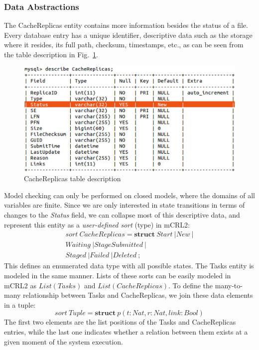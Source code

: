 \documentclass[sort&compress,preprint,3p]{elsarticle}
\begin{document}
\subsubsection{Data Abstractions}
The CacheReplicas entity contains more information besides the status of a file.
Every database entry has a unique identifier, descriptive data such as 
the storage where it resides, its full path, checksum, timestamps, etc., as can be seen
from the table description in Fig.~\ref{fig:CacheReplicasTable}.
\begin{figure}[bp!]
\begin{center}
 \includegraphics[width=0.5\linewidth,keepaspectratio=true]{./graphics/Figure5.png}
\end{center}
\caption{CacheReplicas table description}
\label{fig:CacheReplicasTable}
\end{figure}
Model checking can only be performed on closed models, where the domains
of all variables are finite. Since we are only interested in state transitions in terms of 
changes to the \textit{Status} field,
we can collapse most of this descriptive data, and represent this entity as a 
\textit{user-defined sort} (type) in mCRL2:
\begin{displaymath}
\begin{aligned}
sort\ CacheReplicas = \textbf{struct}\ Start\ | 
			  New\ |  \\
		    Waiting\ | 
          StageSubmitted\ | \\
		      Staged\ | 
		      Failed\ | 
		  Deleted\ ;
\end{aligned}
\end{displaymath}
This defines an enumerated data type with all possible states.
The Tasks entity is modeled in the same manner. Lists of these sorts can be easily modeled 
in mCRL2 as \begin{math}List(Tasks) \end{math} and 
\begin{math}List(CacheReplicas) \end{math}.
To define the many-to-many relationship between Tasks and CacheReplicas,
we join these data elements in a tuple:
\begin{displaymath}sort \ Tuple = \textbf{struct}\ p(t:Nat,r:Nat,link:Bool)
\end{displaymath}
The first two elements are the list positions of the Tasks and CacheReplicas
entries, while the last one indicates whether a relation between
them exists at a given moment of the system execution. 
\end{document}
